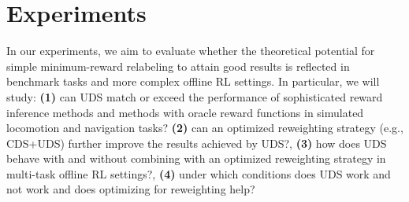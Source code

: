 
\section{Experiments}
\label{sec:exp}
In our experiments, we aim to evaluate whether the theoretical potential for simple minimum-reward relabeling to attain good results is reflected in benchmark tasks and more complex offline RL settings. In particular, we will study: \textbf{(1)} can UDS match or exceed the performance of sophisticated reward inference methods and methods with oracle reward functions in simulated locomotion and navigation tasks? \textbf{(2)} can an optimized reweighting strategy (e.g., CDS+UDS) further improve the results achieved by UDS?, \textbf{(3)} how does UDS behave with and without combining with an optimized reweighting strategy in multi-task offline RL settings?, \textbf{(4)} under which conditions does UDS work and not work and does optimizing for reweighting help?

